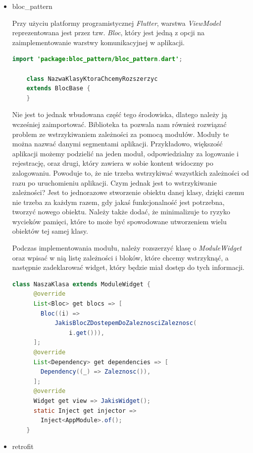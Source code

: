 \documentclass[twoside]{projektInzynierskiMS}
\numberwithin{figure}{section}
\begin{document}
\begin{itemize}
    \item bloc\_pattern
    
    Przy użyciu platformy programistycznej \textit{Flutter}, warstwa \textit{ViewModel} reprezentowana jest przez tzw. \textit{Bloc}, który jest jedną z opcji na zaimplementowanie warstwy komunikacyjnej w aplikacji.
    
    \begin{lstlisting}[language=Java,caption=Rozszerzenie klasy o BlocBase. Źródło: Opracowanie własne. ,captionpos=b]
    import 'package:bloc_pattern/bloc_pattern.dart';
    
    class NazwaKlasyKtoraChcemyRozszerzyc 
    extends BlocBase {
    }
    \end{lstlisting}
    
    Nie jest to jednak wbudowana część tego środowiska, dlatego należy ją wcześniej zaimportować. Biblioteka ta pozwala nam również rozwiązać problem ze wstrzykiwaniem zależności za pomocą modułów. Moduły te można nazwać danymi segmentami aplikacji. Przykładowo, większość aplikacji możemy podzielić na jeden moduł, odpowiedzialny za logowanie i rejestrację, oraz drugi, który zawiera w sobie kontent widoczny po zalogowaniu. Powoduje to, że nie trzeba wstrzykiwać wszystkich zależności od razu po uruchomieniu aplikacji. Czym jednak jest to wstrzykiwanie zależności? Jest to jednorazowe stworzenie obiektu danej klasy, dzięki czemu nie trzeba za każdym razem, gdy jakaś funkcjonalność jest potrzebna, tworzyć nowego obiektu. Należy także dodać, że minimalizuje to ryzyko wycieków pamięci, które to może być spowodowane utworzeniem wielu obiektów tej samej klasy. 
    
    Podczas implementowania modułu, należy rozszerzyć klasę o \textit{ModuleWidget} oraz wpisać w nią listę zależności i bloków, które chcemy wstrzyknąć, a następnie zadeklarować widget, który będzie miał dostęp do tych informacji.
    
    \begin{lstlisting}[language=Java,caption=Rozszerzenie klasy o ModuleWidget. Źródło: Opracowanie własne. ,captionpos=b]
    class NaszaKlasa extends ModuleWidget {
      @override
      List<Bloc> get blocs => [
        Bloc((i) => 
            JakisBlocZDostepemDoZaleznosciZaleznosc(
                i.get())),
      ];
      @override
      List<Dependency> get dependencies => [
        Dependency((_) => Zaleznosc()),
      ];
      @override
      Widget get view => JakisWidget();
      static Inject get injector =>
        Inject<AppModule>.of();
    }
    \end{lstlisting}
    \item retrofit
    

\end{itemize}
\end{document}
